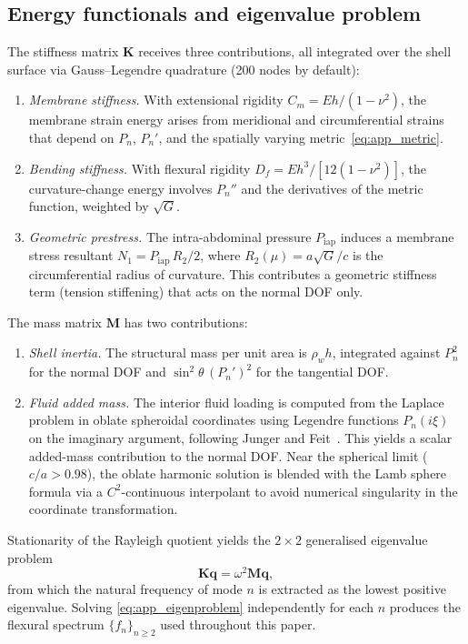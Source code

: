 \subsection{Energy functionals and eigenvalue problem}
\label{sec:appendix_energy}

The stiffness matrix $\mathbf{K}$ receives three contributions, all integrated
over the shell surface via Gauss--Legendre quadrature (200 nodes by default):
\begin{enumerate}
  \item \emph{Membrane stiffness.}  With extensional rigidity
    $C_m = Eh/(1-\nu^2)$, the membrane strain energy arises from meridional
    and circumferential strains that depend on $P_n$, $P_n'$, and the
    spatially varying metric~\eqref{eq:app_metric}.
  \item \emph{Bending stiffness.}  With flexural rigidity
    $D_f = Eh^3/[12(1-\nu^2)]$, the curvature-change energy involves $P_n''$
    and the derivatives of the metric function, weighted by $\sqrt{G}$.
  \item \emph{Geometric prestress.}  The intra-abdominal pressure
    $P_\mathrm{iap}$ induces a membrane stress resultant
    $N_1 = P_\mathrm{iap}\,R_2/2$, where $R_2(\mu) = a\sqrt{G}/c$ is the
    circumferential radius of curvature.  This contributes a geometric
    stiffness term (tension stiffening) that acts on the normal DOF only.
\end{enumerate}

The mass matrix $\mathbf{M}$ has two contributions:
\begin{enumerate}
  \item \emph{Shell inertia.}  The structural mass per unit area is
    $\rho_w h$, integrated against $P_n^2$ for the normal DOF and
    $\sin^2\theta\,(P_n')^2$ for the tangential DOF.
  \item \emph{Fluid added mass.}  The interior fluid loading is computed from
    the Laplace problem in oblate spheroidal coordinates using Legendre
    functions $P_n(i\xi)$ on the imaginary argument, following Junger and
    Feit~\cite{Junger1986}.  This yields a scalar added-mass contribution to
    the normal DOF.  Near the spherical limit ($c/a > 0.98$), the oblate
    harmonic solution is blended with the Lamb sphere formula via a
    $C^2$-continuous interpolant to avoid numerical singularity in the
    coordinate transformation.
\end{enumerate}

Stationarity of the Rayleigh quotient yields the $2\times 2$ generalised
eigenvalue problem
\begin{equation}
  \mathbf{K}\mathbf{q} = \omega^2\mathbf{M}\mathbf{q},
  \label{eq:app_eigenproblem}
\end{equation}
from which the natural frequency of mode $n$ is extracted as the lowest
positive eigenvalue.  Solving \eqref{eq:app_eigenproblem} independently for
each $n$ produces the flexural spectrum $\{f_n\}_{n\geq 2}$ used throughout
this paper.

